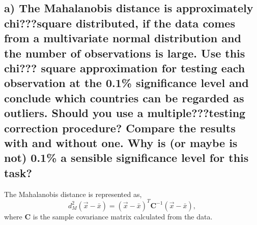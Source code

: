 \documentclass[]{article}
\begin{document}
\subsection{a) The Mahalanobis distance is approximately chi???square
distributed, if the data comes from a multivariate normal distribution
and the number of observations is large. Use this chi??? square
approximation for testing each observation at the 0.1\% significance
level and conclude which countries can be regarded as outliers. Should
you use a multiple???testing correction procedure? Compare the results
with and without one. Why is (or maybe is not) 0.1\% a sensible
significance level for this
task?}\label{a-the-mahalanobis-distance-is-approximately-chisquare-distributed-if-the-data-comes-from-a-multivariate-normal-distribution-and-the-number-of-observations-is-large.-use-this-chi-square-approximation-for-testing-each-observation-at-the-0.1-significance-level-and-conclude-which-countries-can-be-regarded-as-outliers.-should-you-use-a-multipletesting-correction-procedure-compare-the-results-with-and-without-one.-why-is-or-maybe-is-not-0.1-a-sensible-significance-level-for-this-task}

The Mahalanobis distance is represented as,
\[d^2_M(\vec{x} - \bar{x}) = (\vec{x} - \bar{x})^T \boldsymbol{C}^{-1}(\vec{x} - \bar{x}),\]
where \textbf{C} is the sample covariance matrix calculated from the
data.
\end{document}

